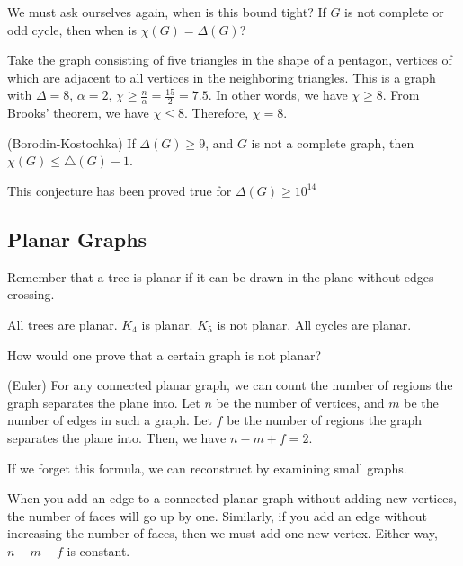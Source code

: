 \documentclass[a4paper]{article}
\begin{document}
We must ask ourselves again, when is this bound tight? If \( G \) is not complete or odd cycle, then when is \( \chi(G) = \Delta(G) \)?

Take the graph consisting of five triangles in the shape of a pentagon, vertices of which are adjacent to all vertices in the neighboring triangles. This is a graph with \( \Delta = 8 \), \( \alpha =2 \), \( \chi \ge \frac{n}{\alpha } = \frac{15}{2} = 7.5 \). In other words, we have \( \chi \ge 8 \). From Brooks' theorem, we have \( \chi \le 8 \). Therefore, \( \chi =8 \).

\begin{conjecture}
	(Borodin-Kostochka) If \( \Delta(G) \ge 9 \), and \( G \) is not a complete graph, then \( \chi(G) \le  \triangle(G) - 1 \). 
\end{conjecture}

\begin{note}
	This conjecture has been proved true for \( \Delta(G) \ge 10^{14} \)
\end{note}

\subsection{Planar Graphs}

Remember that a tree is planar if it can be drawn in the plane without edges crossing.

\begin{eg}
	All trees are planar. \( K_4 \) is planar. \( K_5 \) is not planar. All cycles are planar.
\end{eg}

How would one prove that a certain graph is not planar?

\begin{theorem}
	(Euler) For any connected planar graph, we can count the number of regions the graph separates the plane into. Let \( n \) be the number of vertices, and \( m \) be the number of edges in such a graph. Let \( f \) be the number of regions the graph separates the plane into. Then, we have \( n - m + f = 2\).
\end{theorem}


\begin{note}
	If we forget this formula, we can reconstruct by examining small graphs.
\end{note}

\begin{intuition}
	When you add an edge to a connected planar graph without adding new vertices, the number of faces will go up by one. Similarly, if you add an edge without increasing the number of faces, then we must add one new vertex. Either way, \( n-m+f \) is constant.
\end{intuition}
\end{document}
